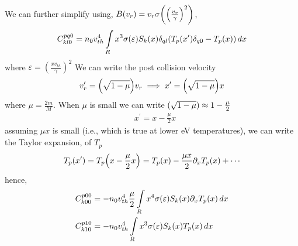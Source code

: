 \documentclass{article}[draft]
\begin{document}
We can further simplify using, $B(v_r)= v_r \sigma\of{\of{\frac{v_r}{\gamma}}^2}$, 
\begin{align*}
C^{pq0}_{kl0}  = n_0 v_{th}^4 \myint_{R} x^3 \sigma\of{\varepsilon} S_k\of{x} \delta_{ql} \of{T_p\of{x^\prime}\delta_{q0} - T_p\of{x}} \diff{x} 
\end{align*}where $\varepsilon=(\frac{x v_{th}}{\gamma})^2$
We can write the post collision velocity 
\begin{align*}
v^{\prime}_r = \of{\sqrt{1- \mu}} v_r \implies  x^{\prime} = \of{\sqrt{1- \mu}} x
\end{align*}where $\mu=\frac{2m}{M}$. When $\mu$ is small we can write $\of{\sqrt{1- \mu}} \approx 1 - \frac{\mu}{2}$
\begin{align*}
&x^{\prime} = x - \frac{\mu}{2} x 
\end{align*} assuming $\mu x$ is small (i.e., which is true at lower eV temperatures), we can write the Taylor expansion, of $T_p$
\begin{align*}
T_p\of{x^{\prime}} =  T_p\of{x - \frac{\mu}{2} x } = T_p\of{x} - \frac{\mu x}{2} \partial_{x} T_p\of{x} + \cdots
\end{align*} hence, 
\begin{align*}
C^{p00}_{k00}  &= -n_0 v_{th}^4 \frac{\mu}{2} \myint_{R} x^4 \sigma\of{\varepsilon} S_k\of{x}\partial_{x} T_p\of{x} \diff{x}  \\
C^{p10}_{k10}  &= -n_0 v_{th}^4 \myint_{R} x^3 \sigma\of{\varepsilon} S_k\of{x} T_p\of{x} \diff{x} 
\end{align*}
\end{document}
